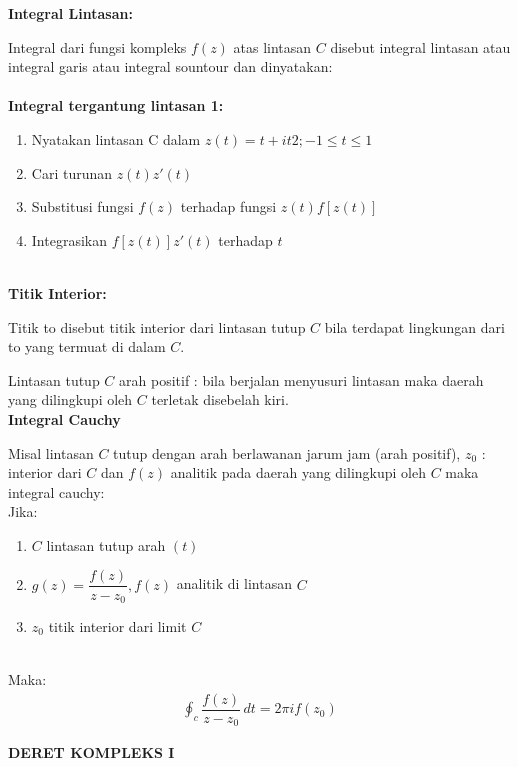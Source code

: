 \documentclass{article}
\begin{document}
\textbf{Integral Lintasan:}

Integral dari fungsi kompleks $f(z)$ atas lintasan $C$ disebut integral lintasan atau integral garis atau integral sountour dan dinyatakan:
\leavevmode\\ \\

\textbf{Integral tergantung lintasan 1:}
\begin{enumerate}
    \item Nyatakan lintasan C dalam $z(t) =t +it2 ; -1 \leq t \leq 1$
    \item Cari turunan $z(t) z'(t)$
    \item Substitusi fungsi $f(z)$ terhadap fungsi $z (t)  f[z(t)]$
    \item Integrasikan  $f[z(t)] z'(t)$ terhadap $t$
\end{enumerate}
\leavevmode\\

\textbf{Titik Interior:}

Titik to disebut titik interior dari lintasan tutup $C$ bila terdapat lingkungan dari to yang termuat di dalam $C$.

Lintasan tutup $C$ arah positif : bila berjalan menyusuri lintasan maka daerah yang dilingkupi oleh $C$ terletak disebelah kiri.
\leavevmode\\

\newpage
\textbf{Integral Cauchy}

Misal lintasan $C$ tutup dengan arah berlawanan jarum jam (arah positif),  $z_0$ : interior dari $C$ dan $f(z)$ analitik pada daerah yang dilingkupi oleh $C$ maka integral cauchy:
\leavevmode\\

Jika:
\begin{enumerate}
    \item $C$ lintasan tutup arah $(t)$
    \item $g(z) = \dfrac{f(z)}{z-z_0} , f(z)$ analitik di lintasan $C$
    \item $z_0$ titik interior dari limit $C$
\end{enumerate}
\leavevmode\\

Maka:
\begin{align}
    \oint_{c}^{} \dfrac{f(z)}{z-z_0} \,dt = 2\pi i f(z_0)
    \nonumber
\end{align}

\newpage
\begin{center}
    \textbf{DERET KOMPLEKS I}
\end{center}
\leavevmode\\
\end{document}
